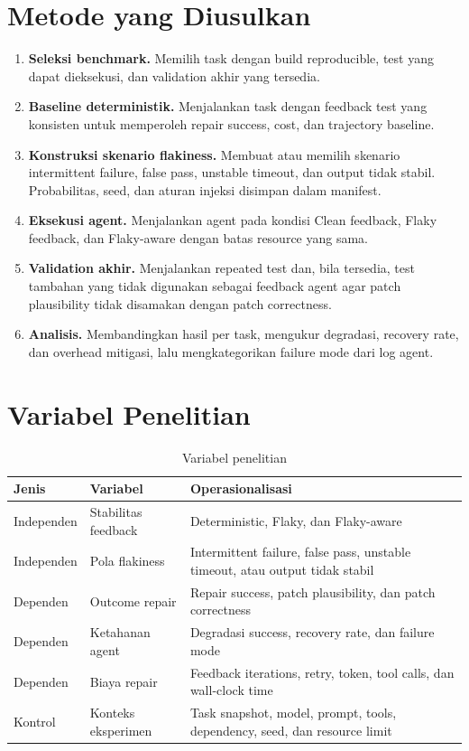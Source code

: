 \section{Metode yang Diusulkan}

\begin{enumerate}[leftmargin=*]
    \item \textbf{Seleksi benchmark.} Memilih task dengan build reproducible, test yang dapat dieksekusi, dan validation akhir yang tersedia.
    \item \textbf{Baseline deterministik.} Menjalankan task dengan feedback test yang konsisten untuk memperoleh repair success, cost, dan trajectory baseline.
    \item \textbf{Konstruksi skenario flakiness.} Membuat atau memilih skenario intermittent failure, false pass, unstable timeout, dan output tidak stabil. Probabilitas, seed, dan aturan injeksi disimpan dalam manifest.
    \item \textbf{Eksekusi agent.} Menjalankan agent pada kondisi Clean feedback, Flaky feedback, dan Flaky-aware dengan batas resource yang sama.
    \item \textbf{Validation akhir.} Menjalankan repeated test dan, bila tersedia, test tambahan yang tidak digunakan sebagai feedback agent agar patch plausibility tidak disamakan dengan patch correctness.
    \item \textbf{Analisis.} Membandingkan hasil per task, mengukur degradasi, recovery rate, dan overhead mitigasi, lalu mengkategorikan failure mode dari log agent.
\end{enumerate}

\section{Variabel Penelitian}

\begin{table}[htbp]
\centering
\small
\caption{Variabel penelitian}
\label{tab:variables}
\begin{tabularx}{\textwidth}{p{3.1cm}YY}
\toprule
\textbf{Jenis} & \textbf{Variabel} & \textbf{Operasionalisasi} \\
\midrule
Independen & Stabilitas feedback & Deterministic, Flaky, dan Flaky-aware \\
Independen & Pola flakiness & Intermittent failure, false pass, unstable timeout, atau output tidak stabil \\
Dependen & Outcome repair & Repair success, patch plausibility, dan patch correctness \\
Dependen & Ketahanan agent & Degradasi success, recovery rate, dan failure mode \\
Dependen & Biaya repair & Feedback iterations, retry, token, tool calls, dan wall-clock time \\
Kontrol & Konteks eksperimen & Task snapshot, model, prompt, tools, dependency, seed, dan resource limit \\
\bottomrule
\end{tabularx}
\end{table}

